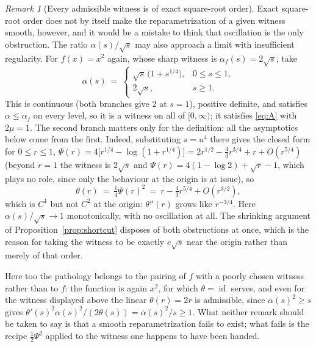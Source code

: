 \documentclass[11pt]{article}
\theoremstyle{plain}
\theoremstyle{definition}
\theoremstyle{remark}
\newtheorem{rem}[thm]{Remark}
\begin{document}
\begin{rem}[Every admissible witness is of exact square-root order]
Exact square-root order does not by itself make the reparametrization of a given
witness smooth, however, and it would be a mistake to think that oscillation is the
only obstruction. The ratio $\alpha(s)/\sqrt s$ may also approach a limit with
insufficient regularity. For $f(x)=x^2$ again, whose sharp witness is
$\alpha_f(s)=2\sqrt s$, take
\[
  \alpha(s) \ =\
  \begin{cases}
    \sqrt s\,\bigl(1+s^{1/4}\bigr) , & 0\le s\le 1 ,\\[1mm]
    2\sqrt s , & s\ge1 .
  \end{cases}
\]
This is continuous (both branches give $2$ at $s=1$), positive definite, and
satisfies $\alpha\le\alpha_f$ on every level, so it is a witness on all of
$[0,\infty)$; it satisfies \eqref{eq:A} with $2\mu=1$. The second branch matters
only for the definition: all the asymptotics below come from the first. Indeed,
substituting $s=u^4$ there gives the closed form
for $0\le r\le1$,
$\Psi(r) = 4\bigl[r^{1/4}-\log(1+r^{1/4})\bigr] = 2r^{1/2}-\tfrac43r^{3/4}+r+O(r^{5/4})$
(beyond $r=1$ the witness is $2\sqrt s$ and $\Psi(r)=4(1-\log2)+\sqrt r-1$, which
plays no role, since only the behaviour at the origin is at issue),
so
\[
  \theta(r) \ =\ \tfrac14\Psi(r)^2 \ =\ r - \tfrac43 r^{5/4} + O(r^{3/2}) ,
\]
which is $C^1$ but not $C^2$ at the origin: $\theta''(r)$ grows like $r^{-3/4}$.
Here $\alpha(s)/\sqrt s\to1$ monotonically, with no oscillation at all. The
shrinking argument of Proposition~\ref{prop:shortcut} disposes of both
obstructions at once, which is the reason for taking the witness to be exactly
$c\sqrt s$ near the origin rather than merely of that order.

Here too the pathology belongs to the pairing of $f$ with a poorly chosen witness
rather than to $f$: the function is again $x^2$, for which $\theta=\operatorname{id}$
serves, and even for the witness displayed above the linear $\theta(r)=2r$ is
admissible, since $\alpha(s)^2\ge s$ gives
$\theta'(s)^2\alpha(s)^2/(2\theta(s)) = \alpha(s)^2/s \ge 1$. What
neither remark should be taken to say is that a smooth reparametrization fails to
exist; what fails is the recipe $\tfrac12\Psi^2$ applied to the witness one happens to
have been handed.
\end{rem}
\end{document}
